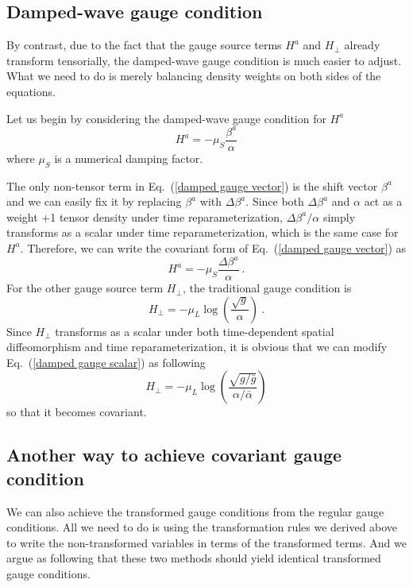 \subsection{Damped-wave gauge condition}\label{dampedwave}
By contrast, due to the fact that the gauge source terms $H^{a}$ and $H_{\perp}$ already transform tensorially, the damped-wave gauge condition is much easier to adjust. What we need to do is merely balancing density weights on both sides of the equations. 

Let us begin by considering the damped-wave gauge condition for $H^{a}$
\begin{equation}\label{damped gauge vector}
H^{a} = -\mu_{S}\frac{\beta^{a}}{\alpha}
\end{equation}
where $\mu_{S}$ is a numerical damping factor. 

The only non-tensor term in Eq.~(\ref{damped gauge vector}) is the shift vector $\beta^{a}$ and we can easily fix it by replacing $\beta^{a}$ with $\Delta \beta^{a}$. Since both $\Delta \beta^{a}$ and $\alpha$ act as a weight +1 tensor density under time reparameterization, $\Delta \beta^{a}/\alpha$ simply transforms as a scalar under time reparameterization, which is the same case for $H^{a}$. Therefore, we can write the covariant form of Eq.~(\ref{damped gauge vector}) as
\begin{equation}\label{covariant damped gauge vector}
H^{a} = -\mu_{S}\frac{\Delta \beta^{a}}{\alpha} \ .
\end{equation}
For the other gauge source term $H_{\perp}$, the traditional gauge condition is
\begin{equation}\label{damped gauge scalar}
H_{\perp} = -\mu_{L}\log\left(\frac{\sqrt{g}}{\alpha}\right) \ .
\end{equation}
Since $H_{\perp}$ transforms as a scalar under both time-dependent spatial diffeomorphism and time reparameterization, it is obvious that we can modify Eq.~(\ref{damped gauge scalar}) as following
\begin{equation}\label{covariant damped gauge scalar}
H_{\perp} = -\mu_{L}\log\left(\frac{\sqrt{g/{\bar g}}}{\alpha/{\bar \alpha}}\right)
\end{equation} 
so that it becomes covariant. 
\subsection{Another way to achieve covariant gauge condition}
We can also achieve the transformed gauge conditions from the regular gauge conditions. All we need to do is using the transformation rules we derived above to write the non-transformed variables in terms of the transformed terms. And we argue as following that these two methods should yield identical transformed gauge conditions. 

